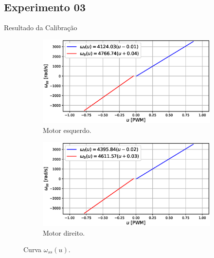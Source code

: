 \subsection{Experimento 03}
\begin{frame}{Resultado da Calibração}

\begin{figure}
    \begin{subfigure}{.45\textwidth}
    \centering
        \includegraphics[width=\textwidth]{figuras/resultados/exp03/curva_feedforward_esquerdo100.eps}
        \caption{Motor esquerdo.}
    \end{subfigure}
    \begin{subfigure}{.45\textwidth}
        \centering
        \includegraphics[width=\textwidth]{figuras/resultados/exp03/curva_feedforward_direito100.eps}
        \caption{Motor direito.}
    \end{subfigure}
    \caption{Curva $\omega_{ss}(u)$.}
\end{figure}

\end{frame}

